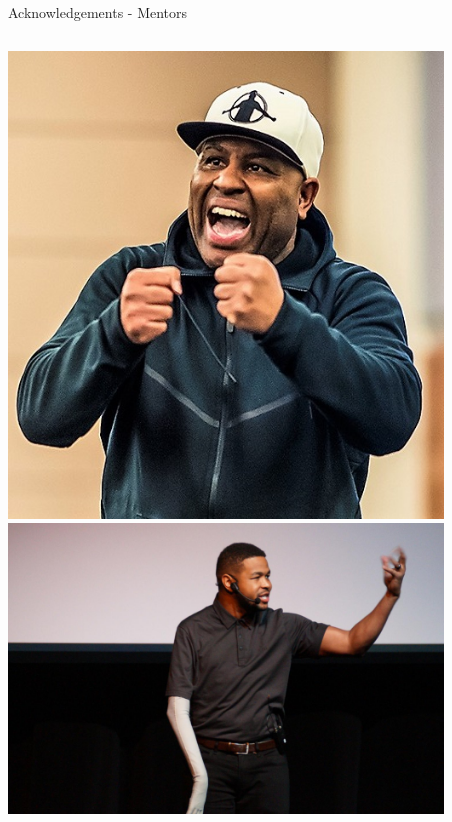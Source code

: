 \documentclass[aspectratio=169]{beamer}
\begin{document}
\begin{frame}{Acknowledgements - Mentors}
\begin{columns}
                \centering
                \includegraphics[width=0.865\textwidth]{people/mentors/et.png}
                \includegraphics[width=0.865\textwidth]{people/mentors/inky.png}
    \end{columns}
\end{frame}
\end{document}
